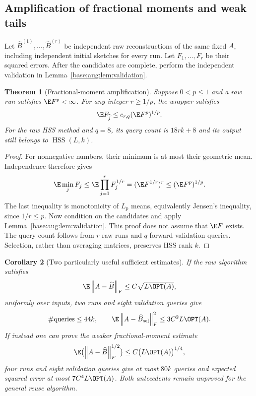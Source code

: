 \documentclass[11pt,oneside,openany,a4paper]{book}
\numberwithin{equation}{chapter}
\newtheorem{theorem}{Theorem}[chapter]
\newtheorem{corollary}[theorem]{Corollary}
\theoremstyle{definition}
\theoremstyle{remark}
\newcommand{\F}[1]{\left\lVert#1\right\rVert_F}
\DeclareMathOperator{\HSS}{HSS}\DeclareMathOperator{\dist}{dist}
\begin{document}
\subsection{Amplification of fractional moments and weak tails}
Let $\widehat B^{(1)},\ldots,\widehat B^{(r)}$ be independent raw
reconstructions of the same fixed $A$, including independent initial
sketches for every run. Let $F_1,\ldots,F_r$ be their squared errors.
After the candidates are complete, perform the independent validation in
Lemma~\ref{base:aug:lem:validation}.

\begin{theorem}[Fractional-moment amplification]\label{base:aug:thm:fractional}
Suppose $0<p\le1$ and a raw run satisfies $\E F^p<\infty$. For any integer
$r\ge1/p$, the wrapper satisfies
\begin{equation}\label{base:aug:eq:fractional-result}
 \E F_{\widehat j}\le c_{r,q}(\E F^p)^{1/p}.
\end{equation}
For the raw HSS method and $q=8$, its query count is $18rk+8$ and its output
still belongs to $\HSS(L,k)$.
\end{theorem}
\begin{proof}
For nonnegative numbers, their minimum is at most their geometric mean.
Independence therefore gives
\[
 \E\min_jF_j
 \le\E\prod_{j=1}^r F_j^{1/r}
 =(\E F^{1/r})^r
 \le(\E F^p)^{1/p}.
\]
The last inequality is monotonicity of $L_p$ means, equivalently Jensen's
inequality, since $1/r\le p$. Now condition on the candidates and apply
Lemma~\ref{base:aug:lem:validation}. This proof does not assume that $\E F$ exists.
The query count follows from $r$ raw runs and $q$ forward validation
queries. Selection, rather than averaging matrices, preserves HSS rank $k$.
\end{proof}

\begin{corollary}[Two particularly useful sufficient estimates]
If the raw algorithm satisfies
\[
 \E\F{A-\widehat B}\le C\sqrt{L\OPT(A)},
\]
uniformly over inputs, two runs and eight validation queries give
\[
 \#\text{queries}\le44k,\qquad
 \E\F{A-\widehat B_{\rm sel}}^2\le3C^2L\OPT(A).
\]
If instead one can prove the weaker fractional-moment estimate
\[
 \E\bigl(\F{A-\widehat B}^{1/2}\bigr)
       \le C\bigl(L\OPT(A)\bigr)^{1/4},
\]
four runs and eight validation queries give at most $80k$ queries and
expected squared error at most $7C^4L\OPT(A)$.
Both antecedents remain unproved for the general reuse algorithm.
\end{corollary}
\end{document}
